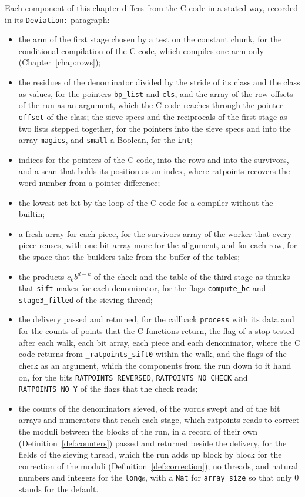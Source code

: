 Each component of this chapter differs from the C code in a stated way, recorded in its
\verb|Deviation:| paragraph:
\begin{itemize}
  \item the arm of the first stage chosen by a test on the constant $\mathrm{chunk}$, for the
    conditional compilation of the C code, which compiles one arm only (Chapter~\ref{chap:rows});
  \item the residues of the denominator divided by the stride of its class and the class as
    values, for the pointers \verb|bp_list| and \verb|cls|, and the array of the row offsets of the
    run as an argument, which the C code reaches through the pointer \verb|offset| of the class; the
    sieve specs and the reciprocals of the first stage as two lists stepped together, for the
    pointers into the sieve specs and into the array \verb|magics|, and \verb|small| a Boolean, for
    the \verb|int|;
  \item indices for the pointers of the C code, into the rows and into the survivors, and a scan
    that holds its position as an index, where ratpoints recovers the word number from a pointer
    difference;
  \item the lowest set bit by the loop of the C code for a compiler without the builtin;
  \item a fresh array for each piece, for the survivors array of the worker that every piece reuses,
    with one bit array more for the alignment, and for each row, for the space that the builders
    take from the buffer of the tables;
  \item the products $c_k b^{d - k}$ of the check and the table of the third stage as thunks that
    \verb|sift| makes for each denominator, for the flags \verb|compute_bc| and
    \verb|stage3_filled| of the sieving thread;
  \item the delivery passed and returned, for the callback \verb|process| with its data and for the
    counts of points that the C functions return, the flag of a stop tested after each walk, each
    bit array, each piece and each denominator, where the C code returns from
    \verb|_ratpoints_sift0| within the walk, and the flags of the check as an argument, which the
    components from the run down to it hand on, for the bits \verb|RATPOINTS_REVERSED|,
    \verb|RATPOINTS_NO_CHECK| and \verb|RATPOINTS_NO_Y| of the flags that the check reads;
  \item the counts of the denominators sieved, of the words swept and of the bit arrays and
    numerators that reach each stage, which ratpoints reads to correct the moduli between the blocks
    of the run, in a record of their own (Definition~\ref{def:counters}) passed and returned beside
    the delivery, for the fields of the sieving thread, which the run adds up block by block for the
    correction of the moduli (Definition~\ref{def:correction}); no threads, and natural numbers and
    integers for the \verb|long|s, with a \verb|Nat| for \verb|array_size| so that only $0$ stands
    for the default.
\end{itemize}

